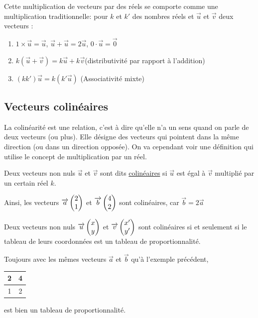 \documentclass[10pt,a4paper,oneside]{book}
\begin{document}
\begin{prop}
  Cette multiplication de vecteurs par des réels se comporte comme une multiplication traditionnelle: pour $k$ et $k'$ des nombres réels et $\overrightarrow{u}$ et $\overrightarrow{v}$ deux vecteurs : 
  \begin{enumerate}
    \item $1 \times \overrightarrow{u} = \overrightarrow{u}$, $\overrightarrow{u} + \overrightarrow{u} = 2 \overrightarrow{u}$, $0 \cdot \overrightarrow{u}= \overrightarrow{0}$
    \item $k(\overrightarrow{u} + \overrightarrow{v}) = k\overrightarrow{u} + k\overrightarrow{v}$(distributivité par rapport à l'addition)
    \item $(kk')\overrightarrow{u} = k(k'\overrightarrow{u})$ (Associativité mixte)
  \end{enumerate}
\end{prop}

\subsection{Vecteurs colinéaires}

La colinéarité est une relation, c'est à dire qu'elle n'a un sens quand on parle de deux vecteurs (ou plus). Elle désigne des vecteurs qui pointent dans la même direction (ou dans un direction opposée).
On va cependant voir une définition qui utilise le concept de multiplication par un réel.


\begin{de}
  Deux vecteurs non nuls $\overrightarrow{u}$ et $\overrightarrow{v}$ sont dits \underline{colinéaires} si $\overrightarrow{u}$ est égal à $\overrightarrow{v}$ multiplié par un certain réel $k$. 
\end{de}

Ainsi, les vecteurs $\overrightarrow{a}  \begin{pmatrix} 2\\ 1 \end{pmatrix}$ et $\overrightarrow{b}  \begin{pmatrix} 4\\ 2 \end{pmatrix}$ sont colinéaires, car $\vec{b}=2\vec{a}$

\begin{prop}
  Deux vecteurs non nuls $\overrightarrow{u}  \begin{pmatrix} x\\ y \end{pmatrix}$ et $\overrightarrow{v}  \begin{pmatrix} x'\\ y' \end{pmatrix}$ sont colinéaires si et seulement si le tableau de leurs coordonnées est un tableau de proportionnalité.
\end{prop}

Toujours avec les mêmes vecteurs $\overrightarrow{a}$ et $\overrightarrow{b}$ qu'à l'exemple précédent,
\begin{tabular}{|c|c|}
  \hline 2 & 4 \\
  \hline 1 & 2\\
  \hline
\end{tabular}  est bien un tableau de proportionnalité.
\end{document}

